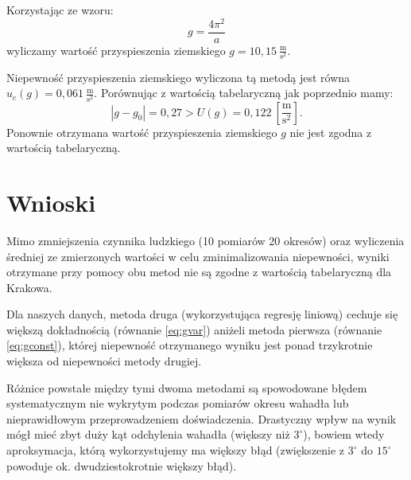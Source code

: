 \documentclass[12pt,a4paper]{article}
\begin{document}
Korzystając ze wzoru:
\begin{equation}
	g = \frac{4\pi^2}{a}
\end{equation}
wyliczamy wartość przyspieszenia ziemskiego $g = 10,15~\frac{\textrm{m}}{\textrm{s}^2}$.

Niepewność przyspieszenia ziemskiego wyliczona tą metodą jest równa $u_c(g) = 0,061~\frac{\textrm{m}}{\textrm{s}^2}$.
Porównując z wartością tabelaryczną jak poprzednio mamy:
\begin{equation}
	|g - g_0| = 0,27 > U(g) = 0,122~[\frac{\textrm{m}}{\textrm{s}^2}].
	\label{eq:gvar}
\end{equation}
Ponownie otrzymana wartość przyspieszenia ziemskiego $g$ nie jest zgodna z wartością tabelaryczną.
\section{Wnioski}
Mimo zmniejszenia czynnika ludzkiego (10 pomiarów 20 okresów) oraz wyliczenia średniej ze zmierzonych wartości w celu zminimalizowania niepewności, wyniki otrzymane przy pomocy obu metod nie są zgodne z wartością tabelaryczną dla Krakowa.

Dla naszych danych, metoda druga (wykorzystująca regresję liniową) cechuje się większą dokładnością (równanie \ref{eq:gvar}) aniżeli metoda pierwsza (równanie \ref{eq:gconst}), której niepewność otrzymanego wyniku jest ponad trzykrotnie większa od niepewności metody drugiej.

Różnice powstałe między tymi dwoma metodami są spowodowane błędem systematycznym nie wykrytym podczas pomiarów okresu wahadła lub nieprawidłowym przeprowadzeniem doświadczenia. Drastyczny wpływ na wynik mógł mieć zbyt duży kąt odchylenia wahadła (większy niż $3^\circ$), bowiem wtedy aproksymacja, którą wykorzystujemy ma większy błąd (zwiększenie z $3^\circ$ do $15^\circ$ powoduje ok. dwudziestokrotnie większy błąd).
\end{document}
